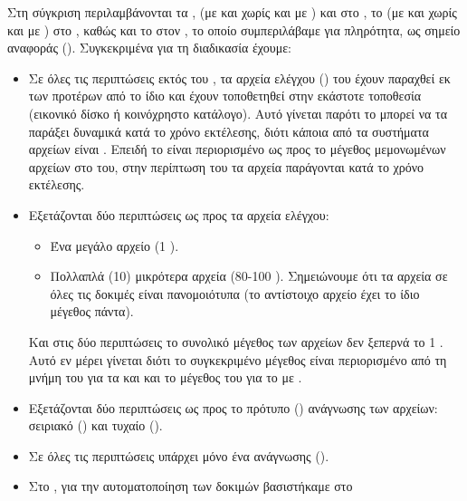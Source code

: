 Στη σύγκριση περιλαμβάνονται τα , \viofs{} (με και χωρίς
 και με ) και  στο
\osv{}, το \viofs{} (με και χωρίς  και με ) στο \linux{}, καθώς και το  στον \host{}, το οποίο
συμπεριλάβαμε για πληρότητα, ως σημείο αναφοράς (). Συγκεκριμένα
για τη διαδικασία έχουμε:
\begin{itemize}
    \item Σε όλες τις περιπτώσεις εκτός του , τα αρχεία ελέγχου
          () του  έχουν παραχθεί εκ των προτέρων από το
          ίδιο και έχουν τοποθετηθεί στην εκάστοτε τοποθεσία (εικονικό δίσκο ή
          κοινόχρηστο κατάλογο). Αυτό γίνεται παρότι το  μπορεί να τα
          παράξει δυναμικά κατά το χρόνο εκτέλεσης, διότι κάποια από τα
          συστήματα αρχείων είναι . Επειδή το  είναι
          περιορισμένο ως προς το μέγεθος μεμονωμένων αρχείων στο 
          του, στην περίπτωση του τα αρχεία παράγονται κατά το χρόνο εκτέλεσης.
    \item Εξετάζονται δύο περιπτώσεις ως προς τα αρχεία ελέγχου:
          \begin{itemize}
              \item Ένα μεγάλο αρχείο (1 ).
              \item Πολλαπλά (10) μικρότερα αρχεία (80-100 ).
                    Σημειώνουμε ότι τα αρχεία σε όλες τις δοκιμές είναι
                    πανομοιότυπα (το αντίστοιχο αρχείο έχει το ίδιο μέγεθος
                    πάντα).
          \end{itemize}
          Και στις δύο περιπτώσεις το συνολικό μέγεθος των αρχείων δεν ξεπερνά
          το 1 . Αυτό εν μέρει γίνεται διότι το συγκεκριμένο μέγεθος
          είναι περιορισμένο από τη μνήμη του \guest{} για τα  και
           και το μέγεθος του  για το \viofs{} με
          .
    \item Εξετάζονται δύο περιπτώσεις ως προς το πρότυπο ()
          ανάγνωσης των αρχείων: σειριακό (\texttt{}) και τυχαίο
          (\texttt{}). %
    \item Σε όλες τις περιπτώσεις υπάρχει μόνο ένα  ανάγνωσης
          (\texttt{}).
    \item Στο \linux{}, για την αυτοματοποίηση των δοκιμών βασιστήκαμε στο

\end{itemize}
